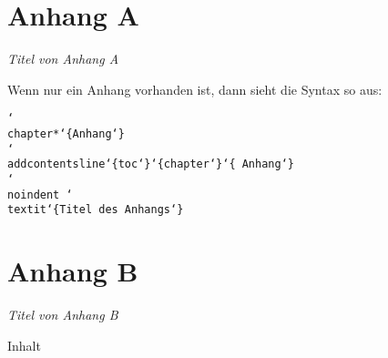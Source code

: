 \begin{appendices}
    \chapter*{Anhang A}
    \noindent \textit{Titel von Anhang A}

Wenn nur ein Anhang vorhanden ist, dann sieht die Syntax so aus:

\noindent \texttt{\char`\\ chapter*\char`\{Anhang\char`\}} \\
\texttt{\char`\\addcontentsline\char`\{toc\char`\}\char`\{chapter\char`\}\char`\{
    Anhang\char`\}} \\
\texttt{\char`\\noindent \char`\\textit\char`\{Titel des Anhangs\char`\}}


    \chapter*{Anhang B}
    \noindent \textit{Titel von Anhang B}

    Inhalt
\end{appendices}




